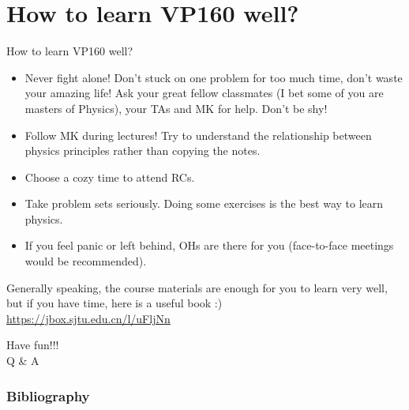 \documentclass{beamer}
\begin{document}
\section{How to learn VP160 well?}
\begin{frame}{How to learn VP160 well?}
    \begin{itemize}
      \item Never fight alone! Don't stuck on one problem for too much time, don't waste your amazing life! Ask your great fellow classmates (I bet some of you are masters of Physics), your TAs and MK for help. Don't be shy!
      \item Follow MK during lectures! Try to understand the relationship between physics principles rather than copying the notes.
      \item Choose a cozy time to attend RCs.
      \item Take problem sets seriously. Doing some exercises is the best way to learn physics.
      \item If you feel panic or left behind, OHs are there for you (face-to-face meetings would be recommended).
    \end{itemize}
\end{frame}

\begin{frame}
  Generally speaking, the course materials are enough for you to learn very well, but if you have time, here is a useful book :)\\
  \underline{\small{\url{https://jbox.sjtu.edu.cn/l/uFljNn}}}
\end{frame}
\begin{frame}
  \centering
  \huge{Have fun!!!}\\
  \huge{Q \& A}
\end{frame}
\renewcommand{\bibfont}{\footnotesize}
\frametitle{Bibliography}




\end{document}
